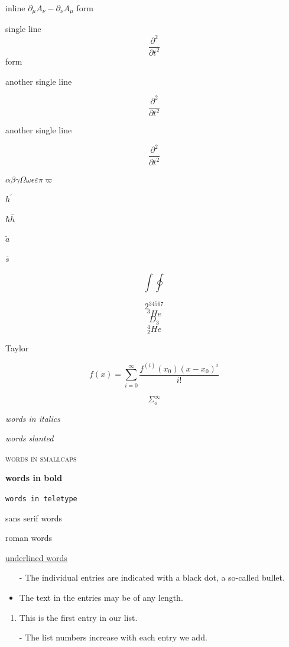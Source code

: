 \documentclass[12pt, letterpaper]{article}
\begin{document}
inline $\partial_\mu A_\nu-\partial_\nu A_\mu$ form

single line
$$
\frac{\partial^2}{\partial t^2}
$$
form

another single line

\[
\frac{\partial^2}{\partial t^2}
\]

another single line

\begin{equation}
    \frac{\partial^2}{\partial t^2}
\end{equation}

$\alpha\beta\gamma\Omega\omega\epsilon\varepsilon\pi\varpi$

$h^\prime$

$\hbar\bar{h}$

$\tilde{a}$

$\bar{s}$

$$\int\oint$$

$$2^{34567} $$
$$^3He$$  
$$D_3$$
$$^4_2He$$

Taylor

\begin{equation}
f(x) = \sum_{i=0}^{\infty} \frac{f^{(i)}(x_0)(x-x_0)^i}{i!}
\end{equation}

$$
\Sigma_o^\infty
$$

\newpage




\textit{words in italics}

\textsl{words slanted}

\textsc{words in smallcaps}

\textbf{words in bold}

\texttt{words in teletype}

\textsf{sans serif words}

\textrm{roman words}

\underline{underlined words}

\newpage


\begin{itemize}
  \item[-] The individual entries are indicated with a black dot, a so-called bullet.
  \item The text in the entries may be of any length.
\end{itemize}


\begin{enumerate}
  \item This is the first entry in our list.
  \item[-] The list numbers increase with each entry we add.
\end{enumerate}
\end{document}
